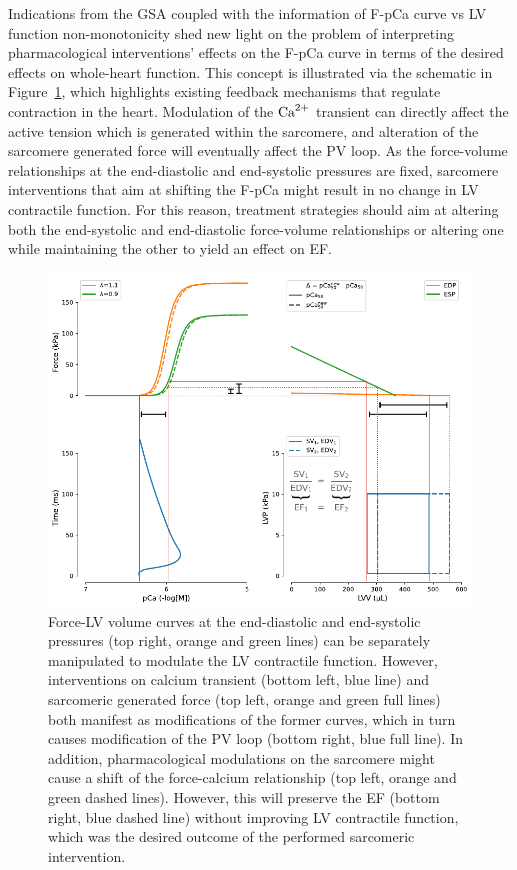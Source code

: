 \vspace{0.2cm}
Indications from the GSA coupled with the information of F-pCa curve vs LV function non-monotonicity shed new light on the problem of interpreting pharmacological interventions' effects on the F-pCa curve in terms of the desired effects on whole-heart function. This concept is illustrated via the schematic in Figure~\ref{fig:schematic}, which highlights existing feedback mechanisms that regulate contraction in the heart. Modulation of the $\textrm{Ca}^{2+}$ transient can directly affect the active tension which is generated within the sarcomere, and alteration of the sarcomere generated force will eventually affect the PV loop. As the force-volume relationships at the end-diastolic and end-systolic pressures are fixed, sarcomere interventions that aim at shifting the F-pCa might result in no change in LV contractile function. For this reason, treatment strategies should aim at altering both the end-systolic and end-diastolic force-volume relationships or altering one while maintaining the other to yield an effect on EF.

\begin{figure}[ht!]
    \myfloatalign
    \includegraphics[width=\textwidth]{figures/chapter08/Fig7.pdf}
    \caption{Force-LV volume curves at the end-diastolic and end-systolic pressures (top right, orange and green lines) can be separately manipulated to modulate the LV contractile function. However, interventions on calcium transient (bottom left, blue line) and sarcomeric generated force (top left, orange and green full lines) both manifest as modifications of the former curves, which in turn causes modification of the PV loop (bottom right, blue full line). In addition, pharmacological modulations on the sarcomere might cause a shift of the force-calcium relationship (top left, orange and green dashed lines). However, this will preserve the EF (bottom right, blue dashed line) without improving LV contractile function, which was the desired outcome of the performed sarcomeric intervention.}
    \label{fig:schematic}
\end{figure}


